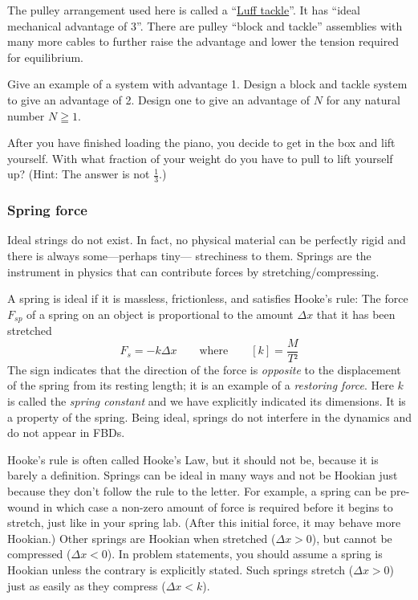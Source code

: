 The pulley arrangement used here is called a “\href{https://en.wikipedia.org/wiki/Pulley}{Luff tackle}”. It has “ideal mechanical advantage of 3”.
There are pulley “block and tackle” assemblies with many more cables to further raise the advantage and lower the tension required for equilibrium. 
\begin{exercise}
Give an example of a system with advantage 1.
Design a block and tackle system to give an advantage of 2. Design one to give an advantage of $N$ for any natural number $N≧ 1$. 
\end{exercise}
\begin{exercise}
After you have finished loading the piano, you decide to get in the box and lift yourself. With what fraction of your weight do you have to pull to lift yourself up? (Hint: The answer is not $\frac13$.)
\end{exercise}


\subsubsection{Spring force}
Ideal strings do not exist. In fact, no physical material can be perfectly rigid and there is always some---perhaps tiny--- strechiness to them. 
Springs are the instrument in physics that can contribute forces by stretching/compressing. 

A spring is ideal if it is massless, frictionless, and satisfies Hooke's rule: The force $F_{sp}$ of a spring on an object is proportional to the amount $Δx$ that it has been stretched
$$
F_s = -k Δx
\quad \quad \textrm{where} \quad \quad 
[k] = \frac{M}{T²}
$$
The sign indicates that the direction of the force is {\em opposite} to the displacement of the spring from its resting length; it is an example of a {\em restoring force}.
Here $k$ is called the {\em spring constant}
and we have explicitly indicated its dimensions. It is a property of the spring. Being ideal, springs do not interfere in the dynamics and do not appear in FBDs.


Hooke's rule is often called Hooke's Law, but it should not be, because it is barely a definition. Springs can be ideal in many ways and not be Hookian just because they don't follow the rule to the letter. For example, a spring can be pre-wound in which case a non-zero amount of force is required before it begins to stretch, just like in your spring lab. (After this initial force, it may behave more Hookian.) 
Other springs are Hookian when stretched ($Δ x >0$), but cannot be compressed ($Δ x<0$). 
In problem statements, you should assume a spring is Hookian unless the contrary is explicitly stated. Such springs stretch ($Δx >0$) just as easily as they compress ($Δx<k$). 

